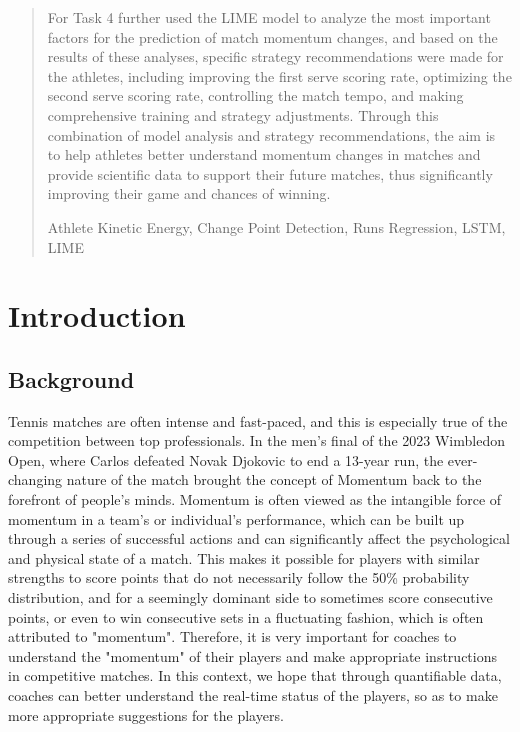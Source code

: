 \documentclass{mcmthesis}
\renewcommand{\contentsname}{\hspace*{\fill}\Large\bfseries Contents \hspace*{\fill}}
\begin{document}
\begin{abstract}
    For Task 4 further used the LIME model to analyze the most important factors for the prediction of match momentum changes, and based on the results of these analyses, specific strategy recommendations were made for the athletes, including improving the first serve scoring rate, optimizing the second serve scoring rate, controlling the match tempo, and making comprehensive training and strategy adjustments. Through this combination of model analysis and strategy recommendations, the aim is to help athletes better understand momentum changes in matches and provide scientific data to support their future matches, thus significantly improving their game and chances of winning.
    \begin{keywords}
        Athlete Kinetic Energy, Change Point Detection, Runs Regression, LSTM, LIME
    \end{keywords}
\end{abstract}

\maketitle

\tableofcontents   %
\thispagestyle{empty}

\newpage


\section{Introduction}

\subsection{Background}
Tennis matches are often intense and fast-paced, and this is especially true of the competition between top professionals. In the men's final of the 2023 Wimbledon Open, where Carlos defeated Novak Djokovic to end a 13-year run, the ever-changing nature of the match brought the concept of Momentum back to the forefront of people's minds. Momentum is often viewed as the intangible force of momentum in a team's or individual's performance, which can be built up through a series of successful actions and can significantly affect the psychological and physical state of a match. This makes it possible for players with similar strengths to score points that do not necessarily follow the 50\% probability distribution, and for a seemingly dominant side to sometimes score consecutive points, or even to win consecutive sets in a fluctuating fashion, which is often attributed to "momentum". Therefore, it is very important for coaches to understand the "momentum" of their players and make appropriate instructions in competitive matches. In this context, we hope that through quantifiable data, coaches can better understand the real-time status of the players, so as to make more appropriate suggestions for the players.
\end{document}
